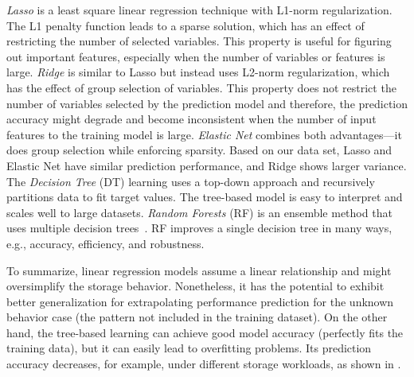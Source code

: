 \textit{Lasso} 
is a least square linear regression technique with L1-norm regularization.
The L1 penalty function leads to a sparse solution, which has an effect of restricting 
the number of selected variables.
This property is useful for figuring out important features, especially 
when the number of variables or features is large.
%
\textit{Ridge} is similar to Lasso but instead uses L2-norm regularization, 
which has the effect of group selection of variables.
This property does not restrict the number of variables selected by the prediction model 
and therefore, the prediction accuracy might degrade and become inconsistent 
when the number of input features to the training model is large. 
%
\textit{Elastic Net} combines both advantages---it does group selection while enforcing sparsity.
Based on our data set, Lasso and Elastic Net have similar prediction performance, and Ridge shows larger variance.
%
The \textit{Decision Tree} (DT) learning uses a top-down approach and recursively partitions data to fit target values.
The tree-based model is easy to interpret and scales well to large datasets.
\textit{Random Forests} (RF) is an ensemble method that uses multiple decision trees~\cite{hastie2005}.
RF improves a single decision tree in many ways, e.g., accuracy, efficiency, and robustness.

To summarize, linear regression models assume a linear relationship and might oversimplify the storage behavior. 
Nonetheless, it has the potential to exhibit better generalization for extrapolating performance prediction 
for the unknown behavior case (the pattern not included in the training dataset).
On the other hand, the tree-based learning can achieve good model accuracy (perfectly fits the training data), 
but it can easily lead to overfitting problems.
Its prediction accuracy decreases, for example,
under different storage workloads,
as shown in \myfigure{\ref{fig:challenge_generalization}}.


